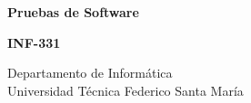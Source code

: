 \documentclass[spanish, fleqn]{article}
\begin{document}
\thispagestyle{empty}
\vspace*{0.5cm}
\begin{center}
  {
    \fontsize{45}{47}\bfseries
    Pruebas de Software
    \par
  }
  \vspace*{1em}
  {
    \fontsize{35}{37}\bfseries
    INF-331
    \par
  }
\end{center}
\vfill
\vfill
\noindent
\begin{center}
  \huge\sffamily

\end{center}
\vfill
\begin{center}

  \vspace*{5em}

  \date{}
  \vspace*{2\baselineskip}

  {\large\sffamily
   Departamento de Informática\\
   Universidad Técnica Federico Santa María
  }
\end{center}

\clearpage


\thispagestyle{fancy}

\newpage


\tableofcontents

\newpage












    
\end{document}
